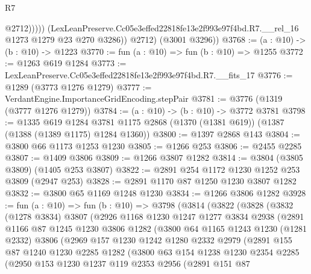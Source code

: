 \begin{lexlean}{R7}
\begin{coremodule}
                    @2712)))))
          (LexLeanPreserve.Cc05e3effed22818fe13e2f993e97f4bd.R7.__rel_16
            @1273
            @1279
            @23
            @270
            @3286))
        @2712)
      (@3001 @3296))
@3768 := (a : @10) -> (b : @10) -> @1223
@3770 := fun (a : @10) => fun (b : @10) => @1255
@3772 := @1263 @619 @1284
@3773 := LexLeanPreserve.Cc05e3effed22818fe13e2f993e97f4bd.R7.__fits_17
@3776 := @1289 (@3773 @1276 @1279)
@3777 := VerdantEngine.ImportanceGridEncoding.stepPair
@3781 := @3776 (@1319 (@3777 @1276 @1279))
@3784 := (a : @10) -> (b : @10) -> @3772 @3781
@3798 := @1335
    @619
    @1284
    @3781
    @1175
    @2868
    (@1370 (@1381 @619))
    (@1387 (@1388 (@1389 @1175) @1284 @1360))
@3800 := @1397 @2868 @143
@3804 := @3800 @66 @1173 @1253 @1230
@3805 := @1266 @253
@3806 := @2455 @2285
@3807 := @1409 @3806
@3809 := @1266 @3807 @1282
@3814 := @3804 (@3805 @3809) (@1405 @253 @3807)
@3822 := @2891 @254 @1172 @1230 @1252 @253 @3809 (@2947 @253)
@3828 := @2891 @1170 @87 @1250 @1230 @3807 @1282
@3832 := @3800 @65 @1169 @1248 @1230
@3834 := @1266 @3806 @1282
@3928 := fun (a : @10) =>
  fun (b : @10) =>
  @3798
    (@3814
      (@3822
        (@3828
          (@3832
            (@1278 @3834)
            @3807
            (@2926
              @1168
              @1230
              @1247
              @1277
              @3834
              @2938
              (@2891
                @1166
                @87
                @1245
                @1230
                @3806
                @1282
                (@3800
                  @64
                  @1165
                  @1243
                  @1230
                  (@1281 @2332)
                  @3806
                  (@2969
                    @157
                    @1230
                    @1242
                    @1280
                    @2332
                    @2979
                    (@2891
                      @155
                      @87
                      @1240
                      @1230
                      @2285
                      @1282
                      (@3800
                        @63
                        @154
                        @1238
                        @1230
                        @2354
                        @2285
                        (@2950
                          @153
                          @1230
                          @1237
                          @119
                          @2353
                          @2956
                          (@2891
                            @151
                            @87

\end{coremodule}
\end{lexlean}
